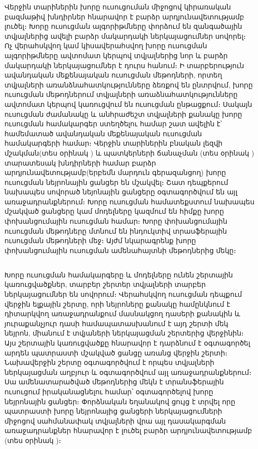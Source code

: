 \documentclass[12pt]{article}
\begin{document}
Վերջին տարիներին խորը ուսուցուման միջոցով կիրառական բազմաթիվ խնդիրներ հնարավոր է բարձր արդյունավետությամբ լուծել։ Խորը ուսուցման ալգորիթմները փորձում են զանգածային տվյալներից ավելի բարձր մակարդակի  ներկայացումներ սովորել։  Ոչ վերահսկվող կամ կիսավերահսվող խորը ուսուցման ալգորիթմները ավտոմատ կերպով տվյալներից նոր և բարձր մակարդակի ներկայացումներ է դուրս հանում։ Ի տարբերություն ավանդական մեքենայական ուսուցման մեթոդների, որտեղ  տվյալների առանձնահատկությունները ձեռքով են ընտրվում,  խորը ուսուցման մեթոդներում տվյալների առաձնահատկությունները ավտոմատ կերպով կառուցվում են ուսուցման ընթացքում։ Սակայն ուսուցման ժամանակը և անհրաժեշտ տվյալների քանակը խորը ուսուցման համակարգեր ստեղծելու համար շատ ավելին է՝ համեմատած ավանդական մեքենայական ուսուցման համակարգերի համար։ Վերջին տարիներին բնական լեզվի մշակման(տես օրինակ \cite{bib_item_6, bib_item_7}) և պատկերների ճանաչման (տես օրինակ \cite{bib_item_4, bib_item_5}) տարատեսակ խնդիրների համար բարձր արդյունավետությամբ(երբեմն մարդուն գերազանցող) խորը ուսուցման նեյրոնային ցանցեր են  մշակվել։ Շատ դեպքերում նախապես սովորած նեյոնային ցանցերը օգտագործվում են այլ առաջադրանքներում։ Խորը ուսուցման համատեքստում նախապես մշակված ցանցերը կամ մոդելները կազմում են հիմքը  խորը փոխանցումային ուսուցման համար։ Խորը փոխանցումային ուսուցման մեթոդները մտնում են ինդուկտիվ տրասֆերային ուսուցման մեթոդների մեջ։ Այժմ նկարագրենք խորը փոխանցումային ուսուցման ամենահայտնի մեթոդներից մեկը։ \\

\begin{center}
\subsection*{
 } 
 \end{center}
 \noindent
{}
{}

Խորը ուսուցման համակարգերը և մոդելները ունեն շերտային կառուցվածքներ, տարբեր շերտեր տվյալների տարբեր ներկայացումներ են սովորում։ Վերահսկվող ուսուցման դեպքում վերջին ելքային շերտը, որի նեյրոները քանակը համընկնում  է  դիտարկվող առաջադրանքում մասնակցող դասերի քանակին և յուրաքանչյուր դասի համապատասխանում է այդ շերտի մեկ նեյրոն,   միանում է տվյաների ներկայացման շերտերից վերջինին։ Այս շերտային կառուցվածքը հնարավոր է դարձնում է օգտագործել արդեն պատրաստի մշակված ցանցը առանց վերջին շերտի։ Նախավերջին շերտը օգտագործվում է որպես տվյալների ներկայացման աղբյուր և օգտագործվում այլ առաջադրանքներում։  Սա ամենատարածված մեթոդներից մեկն է տրանսֆերային ուսուցում իրականացնելու համար՝ օգտագործելով խորը նեյրոնային ցանցեր։ Փորձնական եղանակով ցույց է տրվել որը պատրաստի խորը նեյրոնայից ցանցերի ներկայացումների միջոցով սահմանափակ տվյալների վրա այլ դասակարգման առաջադրանքներ հնարավոր է լուծել բարձր արդյունավետությամբ (տես օրինակ \cite{bib_item_8})։ \\
\end{document}
